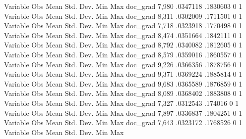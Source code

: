 {\smallskip}
    Variable {\VBAR}        Obs        Mean    Std. Dev.       Min        Max
    doc_grad {\VBAR}      7,980    .0347118    .1830603          0          1
{\smallskip}
    Variable {\VBAR}        Obs        Mean    Std. Dev.       Min        Max
    doc_grad {\VBAR}      8,311    .0302009    .1711501          0          1
{\smallskip}
    Variable {\VBAR}        Obs        Mean    Std. Dev.       Min        Max
    doc_grad {\VBAR}      7,718    .0323918    .1770498          0          1
{\smallskip}
    Variable {\VBAR}        Obs        Mean    Std. Dev.       Min        Max
    doc_grad {\VBAR}      8,474    .0351664    .1842111          0          1
{\smallskip}
    Variable {\VBAR}        Obs        Mean    Std. Dev.       Min        Max
    doc_grad {\VBAR}      8,792    .0340082    .1812605          0          1
{\smallskip}
    Variable {\VBAR}        Obs        Mean    Std. Dev.       Min        Max
    doc_grad {\VBAR}      8,579    .0359016    .1860557          0          1
{\smallskip}
    Variable {\VBAR}        Obs        Mean    Std. Dev.       Min        Max
    doc_grad {\VBAR}      9,226    .0366356    .1878756          0          1
{\smallskip}
    Variable {\VBAR}        Obs        Mean    Std. Dev.       Min        Max
    doc_grad {\VBAR}      9,371    .0369224    .1885814          0          1
{\smallskip}
    Variable {\VBAR}        Obs        Mean    Std. Dev.       Min        Max
    doc_grad {\VBAR}      9,683    .0365589    .1876859          0          1
{\smallskip}
    Variable {\VBAR}        Obs        Mean    Std. Dev.       Min        Max
    doc_grad {\VBAR}      8,089    .0368402    .1883808          0          1
{\smallskip}
    Variable {\VBAR}        Obs        Mean    Std. Dev.       Min        Max
    doc_grad {\VBAR}      7,327    .0312543     .174016          0          1
{\smallskip}
    Variable {\VBAR}        Obs        Mean    Std. Dev.       Min        Max
    doc_grad {\VBAR}      7,897    .0336837    .1804251          0          1
{\smallskip}
    Variable {\VBAR}        Obs        Mean    Std. Dev.       Min        Max
    doc_grad {\VBAR}      7,643    .0323172    .1768526          0          1
{\smallskip}
    Variable {\VBAR}        Obs        Mean    Std. Dev.       Min        Max
